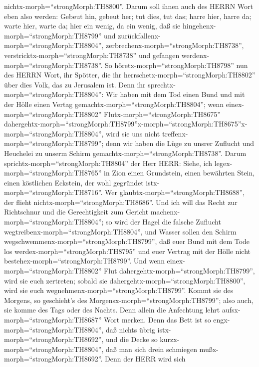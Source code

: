 nichtx-morph=``strongMorph:TH8800''.  Darum soll ihnen auch
des HERRN Wort eben also werden: Gebeut hin, gebeut her; tut dies, tut
das; harre hier, harre da; warte hier, warte da; hier ein wenig, da ein
wenig, daß sie hingehenx-morph=``strongMorph:TH8799'' und
zurückfallenx-morph=``strongMorph:TH8804'',
zerbrechenx-morph=``strongMorph:TH8738'',
verstricktx-morph=``strongMorph:TH8738'' und gefangen
werdenx-morph=``strongMorph:TH8738''.  So
höretx-morph=``strongMorph:TH8798'' nun des HERRN Wort, ihr Spötter, die
ihr herrschetx-morph=``strongMorph:TH8802'' über dies Volk, das zu
Jerusalem ist.  Denn ihr
sprechtx-morph=``strongMorph:TH8804'': Wir haben mit dem Tod einen Bund
und mit der Hölle einen Vertag gemachtx-morph=``strongMorph:TH8804'';
wenn einex-morph=``strongMorph:TH8802''
Flutx-morph=``strongMorph:TH8675''
dahergehtx-morph=``strongMorph:TH8799''\textbar x-morph=``strongMorph:TH8675''x-morph=``strongMorph:TH8804'',
wird sie uns nicht treffenx-morph=``strongMorph:TH8799''; denn wir haben
die Lüge zu unsrer Zuflucht und Heuchelei zu unserm Schirm
gemachtx-morph=``strongMorph:TH8738''.  Darum
sprichtx-morph=``strongMorph:TH8804'' der Herr HERR: Siehe, ich
legex-morph=``strongMorph:TH8765'' in Zion einen Grundstein, einen
bewährten Stein, einen köstlichen Eckstein, der wohl gegründet
istx-morph=``strongMorph:TH8716''. Wer
glaubtx-morph=``strongMorph:TH8688'', der flieht
nichtx-morph=``strongMorph:TH8686''.  Und ich will das
Recht zur Richtschnur und die Gerechtigkeit zum Gericht
machenx-morph=``strongMorph:TH8804''; so wird der Hagel die falsche
Zuflucht wegtreibenx-morph=``strongMorph:TH8804'', und Wasser sollen den
Schirm wegschwemmenx-morph=``strongMorph:TH8799'',  daß
euer Bund mit dem Tode los werdex-morph=``strongMorph:TH8795'' und euer
Vertrag mit der Hölle nicht bestehex-morph=``strongMorph:TH8799''. Und
wenn einex-morph=``strongMorph:TH8802'' Flut
dahergehtx-morph=``strongMorph:TH8799'', wird sie euch zertreten; sobald
sie dahergehtx-morph=``strongMorph:TH8800'', wird sie euch
wegnehmenx-morph=``strongMorph:TH8799''.  Kommt sie des
Morgens, so geschieht's des Morgensx-morph=``strongMorph:TH8799''; also
auch, sie komme des Tags oder des Nachts. Denn allein die Anfechtung
lehrt aufsx-morph=``strongMorph:TH8687'' Wort merken.  Denn
das Bett ist so engx-morph=``strongMorph:TH8804'', daß nichts übrig
istx-morph=``strongMorph:TH8692'', und die Decke so
kurzx-morph=``strongMorph:TH8804'', daß man sich drein schmiegen
mußx-morph=``strongMorph:TH8692''.  Denn der HERR wird sich
